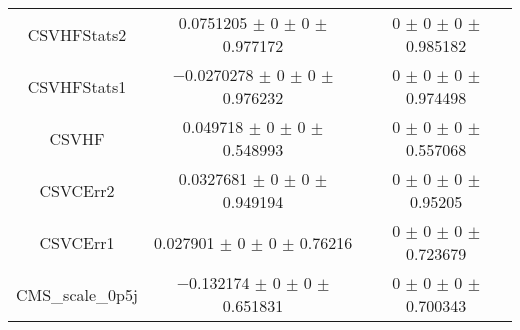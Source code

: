 \begin{table}
\begin{tabular}{ccc}
CSVHFStats2 	& \num{0.0751205} $\pm$ \num{0} $\pm$ \num{0} $\pm$ \num{0.977172} 	& \num{0} $\pm$ \num{0} $\pm$ \num{0} $\pm$ \num{0.985182}\\
CSVHFStats1 	& \num{-0.0270278} $\pm$ \num{0} $\pm$ \num{0} $\pm$ \num{0.976232} 	& \num{0} $\pm$ \num{0} $\pm$ \num{0} $\pm$ \num{0.974498}\\
CSVHF 	& \num{0.049718} $\pm$ \num{0} $\pm$ \num{0} $\pm$ \num{0.548993} 	& \num{0} $\pm$ \num{0} $\pm$ \num{0} $\pm$ \num{0.557068}\\
CSVCErr2 	& \num{0.0327681} $\pm$ \num{0} $\pm$ \num{0} $\pm$ \num{0.949194} 	& \num{0} $\pm$ \num{0} $\pm$ \num{0} $\pm$ \num{0.95205}\\
CSVCErr1 	& \num{0.027901} $\pm$ \num{0} $\pm$ \num{0} $\pm$ \num{0.76216} 	& \num{0} $\pm$ \num{0} $\pm$ \num{0} $\pm$ \num{0.723679}\\
CMS\_scale\_0p5j 	& \num{-0.132174} $\pm$ \num{0} $\pm$ \num{0} $\pm$ \num{0.651831} 	& \num{0} $\pm$ \num{0} $\pm$ \num{0} $\pm$ \num{0.700343}\\
\bottomrule
\end{tabular}
\end{table}